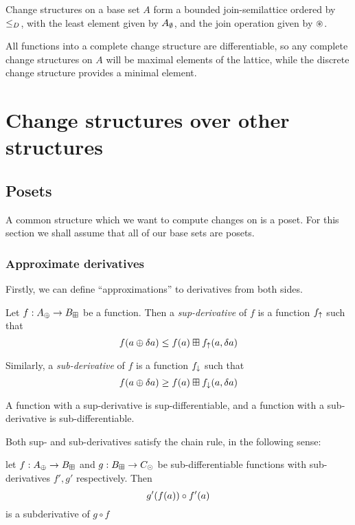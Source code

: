 \begin{thm}
  Change structures on a base set $A$ form a bounded join-semilattice 
  ordered by $\leq_D$, with the least element given by
  $A_\emptyset$, and the join operation given by $\circledast$.
\end{thm}

All functions into a complete change structure are differentiable, so any
complete change structures on $A$ will be maximal elements of the lattice, while
the discrete change structure provides a minimal element.

\section{Change structures over other structures}
\label{sec:moreStructures}

\subsection{Posets}

A common structure which we want to compute changes on is a poset. For this
section we shall assume that all of our base sets are posets.

\subsubsection{Approximate derivatives}

Firstly, we can define ``approximations'' to derivatives from both sides.

\begin{defn}
  Let $f: A_\oplus \rightarrow B_\boxplus$ be a function. Then a \textit{sup-derivative}
  of $f$ is a function $f_\uparrow$ such that
  $$f(a \oplus \delta a) \leq f(a) \boxplus f_\uparrow(a, \delta a)$$
  
  Similarly, a \textit{sub-derivative} of $f$ is a function $f_\downarrow$ such that 
  $$f(a \oplus \delta a) \geq f(a) \boxplus f_\downarrow(a, \delta a)$$

  A function with a sup-derivative is sup-differentiable, and a function with a
  sub-derivative is sub-differentiable.
\end{defn}

Both sup- and sub-derivatives satisfy the chain rule, in the following sense: 
\begin{prop}
  let $f : A_\oplus \rightarrow B_\boxplus$ and $g : B_\boxplus \rightarrow C_\odot$ be
  sub-differentiable functions with sub-derivatives $f', g'$ respectively. Then
  $$g'(f(a)) \circ f'(a)$$ is a subderivative of $g \circ f$
\end{prop}

